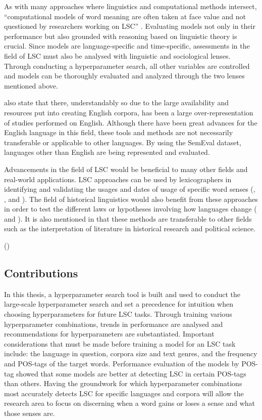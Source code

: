 As with many approaches where linguistics and computational methods intersect, “computational models of word meaning are often taken at face value and not questioned by researchers working on LSC” \citep{hengchen2021challenges}. Evaluating models not only in their performance but also grounded with reasoning based on linguistic theory is crucial. Since models are language-specific and time-specific, assessments in the field of LSC must also be analysed with linguistic and sociological lenses. Through conducting a hyperparameter search, all other variables are controlled and models can be thoroughly evaluated and analyzed through the two lenses mentioned above. 

\citet{hengchen2021challenges} also state that there, understandably so due to the large availability and resources put into creating English corpora, has been a large over-representation of studies performed on English. Although there have been great advances for the English language in this field, these tools and methods are not necessarily transferable or applicable to other languages. By using the SemEval dataset, languages other than English are being represented and evaluated. 

Advancements in the field of LSC would be beneficial to many other fields and real-world applications. LSC approaches can be used by lexicographers in identifying and validating the usages and dates of usage of specific word senses (\citet{lau-etal-2012-word}, \citet{falk-etal-2014-non}, and \citet{klosa-2018-newgerman}). The field of historical linguistics would also benefit from these approaches in order to test the different laws or hypotheses involving how languages change (\citet{hamilton-etal-2016-diachronic} and \citet{Xu2015ACE}). It is also mentioned in \citet{hengchen2021challenges} that these methods are transferable to other fields such as the interpretation of literature in historical research and political science.  

(\citet{lau-etal-2012-word,falk-etal-2014-non,klosa-2018-newgerman})

\subsection{Contributions}
In this thesis, a hyperparameter search tool is built and used to conduct the large-scale hyperparameter search and set a precedence for intuition when choosing hyperparameters for future LSC tasks. Through training various hyperparameter combinations, trends in performance are analysed and recommendations for hyperparameters are substantiated. Important considerations that must be made before training a model for an LSC task include: the language in question, corpora size and text genres, and the frequency and POS-tags of the target words. Performance evaluation of the models by POS-tag showed that some models are better at detecting LSC in certain POS-tags than others. Having the groundwork for which hyperparameter combinations most accurately detects LSC for specific languages and corpora will allow the research area to focus on discerning when a word gains or loses a sense and what those senses are. 



